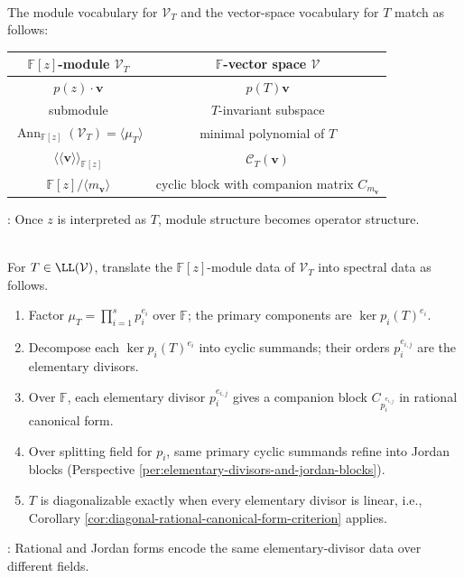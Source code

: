 \begin{perspective} \label{per:module-operator-dictionary} \\
The module vocabulary for $\mathcal{V}_T$ and the vector-space vocabulary for $T$ match as follows:
\begin{center}
\begin{tabular}{c|c}
$\mathbb{F}[z]$-module $\mathcal{V}_T$ & $\mathbb{F}$-vector space $\mathcal{V}$\\
\hline
$p(z)\cdot\mathbf{v}$ & $p(T)\mathbf{v}$\\
submodule & $T$-invariant subspace\\
$\operatorname{Ann}_{\mathbb{F}[z]}(\mathcal{V}_T)=\langle\mu_T\rangle$ & minimal polynomial of $T$\\
$\langle\!\langle\mathbf{v}\rangle\!\rangle_{\mathbb{F}[z]}$ & $\mathcal{C}_T(\mathbf{v})$\\
$\mathbb{F}[z]/\langle m_{\mathbf{v}}\rangle$ & cyclic block with companion matrix $C_{m_{\mathbf{v}}}$
\end{tabular}
\end{center}
: Once $z$ is interpreted as $T$, module structure becomes operator structure.
\end{perspective}

\begin{method} \label{meth:operator-module-to-spectral-form} \\
For $T\in\LL(\mathcal{V})$, translate the $\mathbb{F}[z]$-module data of $\mathcal{V}_T$ into spectral data as follows.
\begin{enumerate}[label=(\roman*)]
\setlength{\itemsep}{0pt}
\item Factor $\mu_T=\prod_{i=1}^s p_i^{e_i}$ over $\mathbb{F}$; the primary components are $\ker p_i(T)^{e_i}$.
\item Decompose each $\ker p_i(T)^{e_i}$ into cyclic summands; their orders $p_i^{e_{i,j}}$ are the elementary divisors.
\item Over $\mathbb{F}$, each elementary divisor $p_i^{e_{i,j}}$ gives a companion block $C_{p_i^{e_{i,j}}}$ in rational canonical form.
\item Over splitting field for $p_i$, same primary cyclic summands refine into Jordan blocks (Perspective \ref{per:elementary-divisors-and-jordan-blocks}).
\item $T$ is diagonalizable exactly when every elementary divisor is linear, i.e., Corollary \ref{cor:diagonal-rational-canonical-form-criterion} applies.
\end{enumerate}
: Rational and Jordan forms encode the same elementary-divisor data over different fields.
\end{method}
